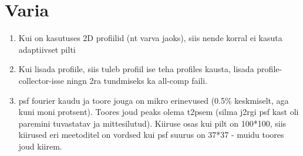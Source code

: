 \documentclass{article}
\begin{document}
	\section{Varia}
	\begin{enumerate}
		\item Kui on kasutuses 2D profiilid (nt varva jaoks), siis nende korral ei kasuta adaptiivset pilti
		\item Kui lisada profiile, siis tuleb profiil ise teha profiles kausta, lisada profile-collector-isse ningn 2ra tundmiseks ka all-comp faili.
		\item psf fourier kaudu ja toore jouga on mikro erinevused (0.5\% keskmiselt, aga kuni moni protsent). Toores joud peaks olema t2psem (silma j2rgi psf kast oli paremini tuvastatav ja mittesilutud). Kiiruse osas kui pilt on 100*100, siis kiirused eri meetoditel on vordsed kui psf suurus on 37*37 - muidu toores joud kiirem.
	\end{enumerate}
\end{document}
